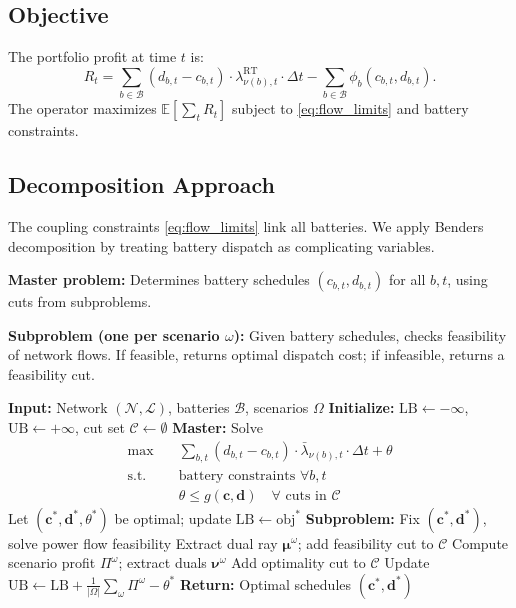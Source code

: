 \documentclass[11pt]{article}
\begin{document}
\subsection{Objective}

The portfolio profit at time $t$ is:
\begin{equation}
    R_t = \sum_{b \in \mathcal{B}} (d_{b,t} - c_{b,t}) \cdot \lambda^{\text{RT}}_{\nu(b),t} \cdot \Delta t - \sum_{b \in \mathcal{B}} \phi_b(c_{b,t}, d_{b,t}).
\end{equation}
The operator maximizes $\mathbb{E}[\sum_t R_t]$ subject to \eqref{eq:flow_limits} and battery constraints.

\subsection{Decomposition Approach}

The coupling constraints \eqref{eq:flow_limits} link all batteries. We apply Benders decomposition by treating battery dispatch as complicating variables.

\textbf{Master problem:} Determines battery schedules $(c_{b,t}, d_{b,t})$ for all $b, t$, using cuts from subproblems.

\textbf{Subproblem (one per scenario $\omega$):} Given battery schedules, checks feasibility of network flows. If feasible, returns optimal dispatch cost; if infeasible, returns a feasibility cut.

\begin{algorithm}[H]
\caption{Benders Decomposition for Portfolio Arbitrage}
\begin{algorithmic}[1]
\State \textbf{Input:} Network $(\mathcal{N}, \mathcal{L})$, batteries $\mathcal{B}$, scenarios $\Omega$
\State \textbf{Initialize:} $\text{LB} \gets -\infty$, $\text{UB} \gets +\infty$, cut set $\mathcal{C} \gets \emptyset$
    \State \textbf{Master:} Solve
    \begin{align*}
        \max \quad & \sum_{b,t} (d_{b,t} - c_{b,t}) \cdot \bar{\lambda}_{\nu(b),t} \cdot \Delta t + \theta \\
        \text{s.t.} \quad & \text{battery constraints } \forall b,t \\
        & \theta \leq g(\mathbf{c}, \mathbf{d}) \quad \forall \text{ cuts in } \mathcal{C}
    \end{align*}
    \State Let $(\mathbf{c}^*, \mathbf{d}^*, \theta^*)$ be optimal; update $\text{LB} \gets \text{obj}^*$
    \For{$\omega \in \Omega$}
        \State \textbf{Subproblem:} Fix $(\mathbf{c}^*, \mathbf{d}^*)$, solve power flow feasibility
            \State Extract dual ray $\boldsymbol{\mu}^\omega$; add feasibility cut to $\mathcal{C}$
        \Else
            \State Compute scenario profit $\Pi^\omega$; extract duals $\boldsymbol{\nu}^\omega$
            \State Add optimality cut to $\mathcal{C}$
        \EndIf
    \EndFor
    \State Update $\text{UB} \gets \text{LB} + \frac{1}{|\Omega|}\sum_\omega \Pi^\omega - \theta^*$
\EndWhile
\State \textbf{Return:} Optimal schedules $(\mathbf{c}^*, \mathbf{d}^*)$
\end{algorithmic}
\end{algorithm}
\end{document}
